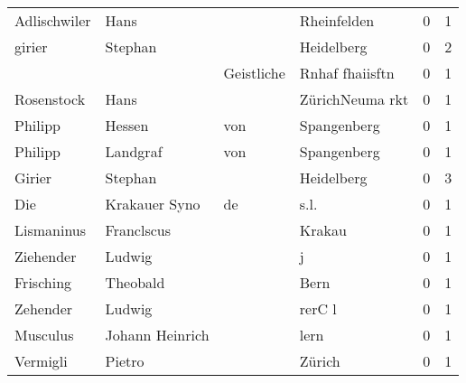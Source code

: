 \begin{tabular}{llllrr}
             Adlischwiler &                               Hans &             &                                 Rheinfelden &          0 &         1 \\
                   girier &                            Stephan &             &                                  Heidelberg &          0 &         2 \\
                          &                                    &  Geistliche &                             Rnhaf fhaiisftn &          0 &         1 \\
               Rosenstock &                               Hans &             &                             ZürichNeuma rkt &          0 &         1 \\
                  Philipp &                             Hessen &         von &                                 Spangenberg &          0 &         1 \\
                  Philipp &                           Landgraf &         von &                                 Spangenberg &          0 &         1 \\
                   Girier &                            Stephan &             &                                  Heidelberg &          0 &         3 \\
                      Die &                      Krakauer Syno &          de &                                        s.l. &          0 &         1 \\
               Lismaninus &                         Franclscus &             &                                      Krakau &          0 &         1 \\
                Ziehender &                             Ludwig &             &                                           j &          0 &         1 \\
                Frisching &                           Theobald &             &                                        Bern &          0 &         1 \\
                 Zehender &                             Ludwig &             &                                      rerC l &          0 &         1 \\
                 Musculus &                    Johann Heinrich &             &                                        lern &          0 &         1 \\
                 Vermigli &                             Pietro &             &                                      Zürich &          0 &         1 \\

\end{tabular}
